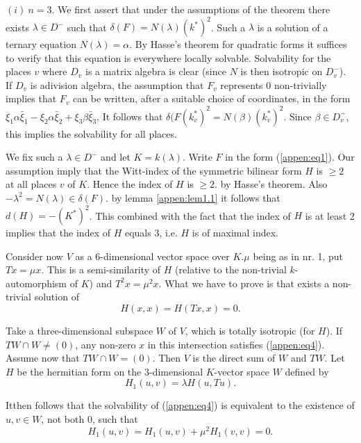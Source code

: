  $(i)~ n=3$. We first assert that under the assumptions of the theorem
there exists $\lambda \in D^-$ such that $\delta
(F)=N(\lambda)(k^*)^2$. Such a $\lambda$ is a solution of a ternary
equation $N(\lambda)= \alpha$. By Hasse's theorem for quadratic forms
it suffices to verify that this equation is everywhere locally
solvable. Solvability for the places $v$ where $D_v$ is a matrix
algebra is clear (since $N$ is then isotropic on $D^-_v$). If $D_v$ is
a\pageoriginale division algebra, the assumption that $F_v$ represents $0$
non-trivially implies that $F_v$ can be written, after a suitable
choice of coordinates, in the form $\xi_1 \alpha \bar{\xi}_1-\xi_2
\alpha \bar{\xi}_2+\xi_3 \beta \bar{\xi}_3$. It follows that $\delta
(F(k^*_v)^2 = N (\beta)(k^*_v)^2$. Since $\beta \in D^-_v$, this
implies the solvability for all places. 

We fix such a $\lambda \in D^-$ and let $K=k(\lambda)$. Write $F$ in
 the form (\ref{appen:eq1}). Our assumption imply that the Witt-index of the
 symmetric bilinear form $H$ is $\ge 2$ at all places $v$ of
 $K$. Hence the index of $H$ is $\ge 2$. by Hasse's theorem. Also $-
 \lambda^2=N(\lambda)\in \delta(F)$. by lemma \ref{appen:lem1.1} it follows that
 $d(H)=-(K^*)^2$. This combined with the fact that the index of $H$ is
 at least 2 implies that the index of $H$ equals 3, i.e. $H$ is
 of maximal index. 
 
 Consider now $V$ as a $6$-dimensional vector space over $K.\mu$ being
 as in nr. 1, put $Tx = \mu x$. This is a semi-similarity of
 $H$ (relative to the non-trivial $k$-automorphism of $K$) and $T^2 x =
 \mu ^2 x$. What we have to prove is that exists a non-trivial
 solution of  
 \begin{equation*}
H(x,x)=H(Tx,x)=0. \tag{4}\label{appen:eq4}
 \end{equation*} 
 
 Take a three-dimensional subspace $W$ of $V$, which is totally
 isotropic (for $H$). If $TW \cap W \neq (0)$, any non-zero $x$ in
 this intersection satisfies (\ref{appen:eq4}). Assume now that $TW \cap
 W=(0)$. Then $V$ is the direct sum of $W$ and $TW$. Let $H$ be the
 hermitian form on the $3$-dimensional $K$-vector space $W$ defined by  
 $$
 H_1(u,v)= \lambda H(u,Tu). 
 $$
 
 It\pageoriginale then follows that the solvability of (\ref{appen:eq4}) is
 equivalent to the existence of $u,v \in W$, not both $0$, such that   
 \begin{equation*}
H_1(u,v)=H_1(u,v)+\mu^2 H_1(v,v)=0. \tag{5}\label{appen:eq5}
 \end{equation*} 
 
